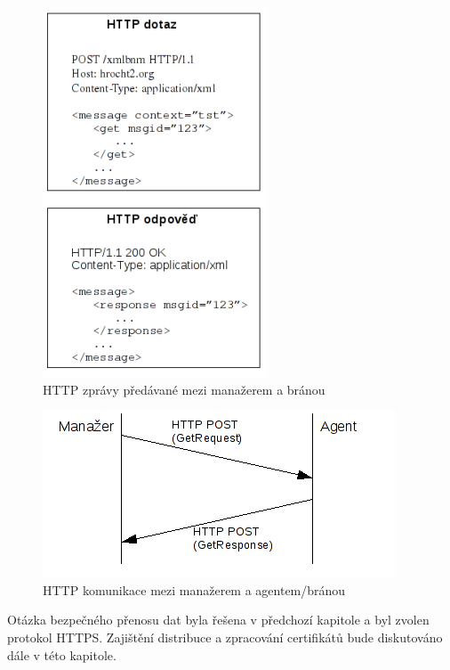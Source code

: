 \begin{figure}[htp]
	\begin{center}
		\includegraphics{obrazky/04_http_post.png}
		\caption{HTTP zprávy předávané mezi manažerem a bránou}
		\label{obr_an_http_post}
	\end{center}
\end{figure}

\begin{figure}[htp]
	\begin{center}
		\includegraphics{obrazky/04_http_request.png}
		\caption{HTTP komunikace mezi manažerem a agentem/bránou}
		\label{obr_an_http_request}
	\end{center}
\end{figure}


Otázka bezpečného přenosu dat byla řešena v předchozí kapitole a byl zvolen protokol HTTPS. Zajištění distribuce a zpracování certifikátů bude
diskutováno dále v této kapitole.


